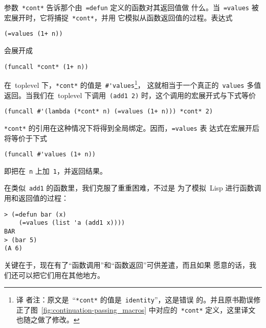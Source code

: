 参数~\texttt{*cont*} 告诉那个由~\texttt{=defun} 定义的函数对其返回值做
什么。当~\texttt{=values} 被宏展开时，它将捕捉~\texttt{*cont*}，并用
它模拟从函数返回值的过程。表达式
\begin{lstlisting}
(=values (1+ n))
\end{lstlisting}
会展开成
\begin{lstlisting}
(funcall *cont* (1+ n))
\end{lstlisting}
在~toplevel 下，\texttt{*cont*} 的值是~\verb|#'values|\footnote{译
  者注：原文是~``\texttt{*cont*} 的值是~\texttt{identity}''，这是错误
  的。并且原书勘误修正了图~\ref{fig:continuation-passing_macros}
  中对应的~\texttt{*cont*} 定义，这里译文也随之做了修改。}，
这就相当于一个真正的~\texttt{values} 多值返回。当我们在~toplevel
下调用~\texttt{(add1 2)} 时，这个调用的宏展开式与下式等价
\begin{lstlisting}
(funcall #'(lambda (*cont* n) (=values (1+ n))) *cont* 2)
\end{lstlisting}
\texttt{*cont*} 的引用在这种情况下将得到全局绑定。因而，\texttt{=values} 表
达式在宏展开后将等价于下式
\begin{lstlisting}
(funcall #'values (1+ n))
\end{lstlisting}
即把在~\texttt{n} 上加~\texttt{1}，并返回结果。

在类似~\texttt{add1} 的函数里，我们克服了重重困难，不过是
为了模拟~Lisp 进行函数调用和返回值的过程：
\begin{lstlisting}
> (=defun bar (x)
    (=values (list 'a (add1 x))))
BAR
> (bar 5)
(A 6)
\end{lstlisting}
关键在于，现在有了``函数调用''和``函数返回''可供差遣，而且如果
愿意的话，我们还可以把它们用在其他地方。

